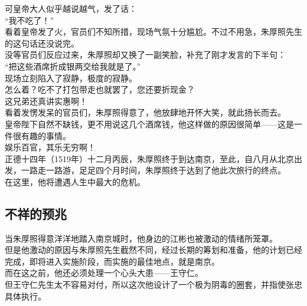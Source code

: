 \begin{multicols}{\theparacolNo}
可皇帝大人似乎越说越气，发了话：\\

“我不吃了！”\\

看着皇帝发了火，官员们不知所措，现场气氛十分尴尬。不过不用急，朱厚照先生的这句话还没说完。\\

没等官员们反应过来，朱厚照却又换了一副笑脸，补充了刚才发言的下半句：\\

“把这些酒席折成银两交给我就是了。”\\

现场立刻陷入了寂静，极度的寂静。\\

怎么着？吃不了打包带走也就罢了，您还要折现金？\\

这兄弟还真讲实惠啊！\\

看着发愣发呆的官员们，朱厚照得意了，他放肆地开怀大笑，就此扬长而去。\\

皇帝陛下自然不缺钱，更不用说这几个酒席钱，他这样做的原因很简单——这是一件很有趣的事情。\\

娱乐百官，其乐无穷啊！\\

正德十四年（1519年）十二月丙辰，朱厚照终于到达南京，至此，自八月从北京出发，一路走一路游，足足四个月时间，朱厚照终于达到了他此次旅行的终点。\\

在这里，他将遭遇人生中最大的危机。\\

\subsection{不祥的预兆}
当朱厚照得意洋洋地踏入南京城时，他身边的江彬也被激动的情绪所笼罩。\\

但是他激动的原因与朱厚照先生截然不同，经过长期的筹划和准备，他的计划已经完成，即将进入实施阶段，而实施的最佳地点，就是南京。\\

而在这之前，他还必须处理一个心头大患——王守仁。\\

但王守仁先生太不容易对付，所以这次他设计了一个极为阴毒的圈套，并指使张忠具体执行。\\


\end{multicols}
